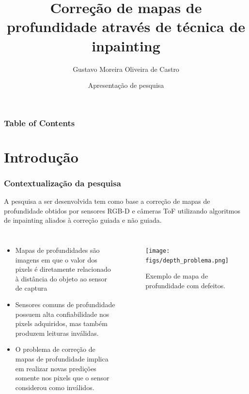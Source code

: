 \documentclass[aspectratio=169]{beamer}
\title[PAVIC] %
{Correção de mapas de profundidade através de técnica de inpainting}
\author[Gustavo Castro] %
{Gustavo Moreira Oliveira de Castro}
\institute[UFAC] %
{
  Programa de Pós Graduação em Ciência da Computação\\
  Universidade Federal do Acre
}
\date[PPGCC] %
{Apresentação de pesquisa}
\begin{document}
\frame{\titlepage}


\begin{frame}
\frametitle{Table of Contents}
\tableofcontents
\end{frame}


\section{Introdução}

\begin{frame}
\frametitle{Contextualização da pesquisa}
A pesquisa a ser desenvolvida tem como base a correção de mapas de profundidade obtidos por sensores RGB-D e câmeras ToF utilizando algoritmos de inpainting aliados à correção guiada e não guiada. 
\begin{columns}
    \begin{itemize}
    \item Mapas de profundidades são imagens em que o valor dos pixels é diretamente relacionado à distância do objeto ao sensor de captura
    \item Sensores comuns de profundidade possuem alta confiabilidade nos pixels adquiridos, mas também produzem leituras inválidas.
    \item O problema de correção de mapas de profundidade implica em realizar novas predições somente nos pixels que o sensor considerou como inválidos.
\end{itemize}


    \begin{figure}
        \centering
        \texttt{[image: figs/depth\_problema.png]}
        \caption{Exemplo de mapa de profundidade com defeitos.}
    \end{figure}
\end{columns}


\end{frame}
\end{document}

